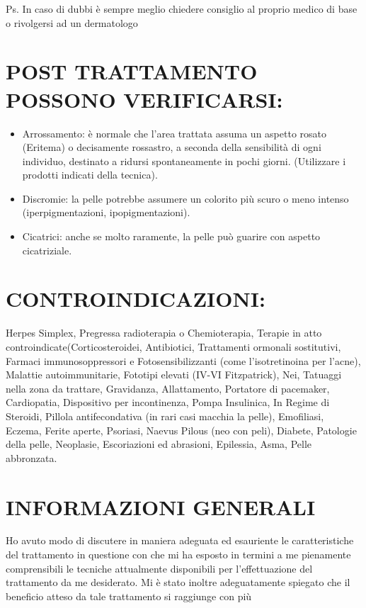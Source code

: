 \documentclass[10pt]{article}
\begin{document}
Ps. In caso di dubbi è sempre meglio chiedere consiglio al proprio medico di base o rivolgersi ad un dermatologo

\section{POST TRATTAMENTO POSSONO VERIFICARSI:}
\begin{itemize}
  \item Arrossamento: è normale che l'area trattata assuma un aspetto rosato (Eritema) o decisamente rossastro, a seconda della sensibilità di ogni individuo, destinato a ridursi spontaneamente in pochi giorni. (Utilizzare i prodotti indicati della tecnica).
  \item Discromie: la pelle potrebbe assumere un colorito più scuro o meno intenso (iperpigmentazioni, ipopigmentazioni).
  \item Cicatrici: anche se molto raramente, la pelle può guarire con aspetto cicatriziale.
\end{itemize}

\section{CONTROINDICAZIONI:}
Herpes Simplex, Pregressa radioterapia o Chemioterapia, Terapie in atto controindicate(Corticosteroidei, Antibiotici, Trattamenti ormonali sostitutivi, Farmaci immunosoppressori e Fotosensibilizzanti (come l'isotretinoina per l'acne), Malattie autoimmunitarie, Fototipi elevati (IV-VI Fitzpatrick), Nei, Tatuaggi nella zona da trattare, Gravidanza, Allattamento, Portatore di pacemaker, Cardiopatia, Dispositivo per incontinenza, Pompa Insulinica, In Regime di Steroidi, Pillola antifecondativa (in rari casi macchia la pelle), Emofiliasi, Eczema, Ferite aperte, Psoriasi, Naevus Pilous (neo con peli), Diabete, Patologie della pelle, Neoplasie, Escoriazioni ed abrasioni, Epilessia, Asma, Pelle abbronzata.

\section{INFORMAZIONI GENERALI}
Ho avuto modo di discutere in maniera adeguata ed esauriente le caratteristiche del trattamento in questione con che mi ha esposto in termini a me pienamente comprensibili le tecniche attualmente disponibili per l'effettuazione del trattamento da me desiderato. Mi è stato inoltre adeguatamente spiegato che il beneficio atteso da tale trattamento si raggiunge con più
\end{document}
